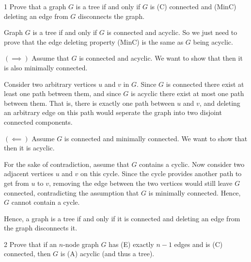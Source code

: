 \documentclass[12pt]{article}
\begin{document}


\begin{problem}{1}
Prove that a graph $G$ is a tree if and only if $G$ is (C) connected and (MinC) deleting an edge from $G$ disconnects the graph.
\end{problem}

\begin{solution}
    \bbni

    Graph $G$ is a tree if and only if $G$ is connected and acyclic. So we just need to prove that the edge deleting property (MinC) is the same as $G$ being acyclic. 

    \bbni 
    $(\implies)$ Assume that $G$ is connected and acyclic. We want to show that then it is also minimally connected. 

    Consider two arbitrary vertices $u$ and $v$ in $G$. Since $G$ is connected there exist at least one path between them, and since $G$ is acyclic there exist at most one path between them. That is, there is exactly one path between $u$ and $v$, and deleting an arbitrary edge on this path would seperate the graph into two disjoint connected components. 

    \bbni
    $(\impliedby)$ Assume $G$ is connected and minimally connected. We want to show that then it is acyclic. 

    For the sake of contradiction, assume that $G$ contains a cyclic. Now consider two adjacent vertices $u$ and $v$ on this cycle. Since the cycle provides another path to get from $u$ to $v$, removing the edge between the two vertices would still leave $G$ connected, contradicting the assumption that $G$ is minimally connected. Hence, $G$ cannot contain a cycle. 

    \bbni
    Hence, a graph is a tree if and only if it is connected and deleting an edge from the graph disconnects it. 
\end{solution}

\newpage 

\begin{problem}{2}
    Prove that if an $n$-node graph $G$ has (E) exactly $n - 1$ edges and is (C) connected, then $G$ is (A) acyclic (and thus a tree).
\end{problem}
\end{document}
